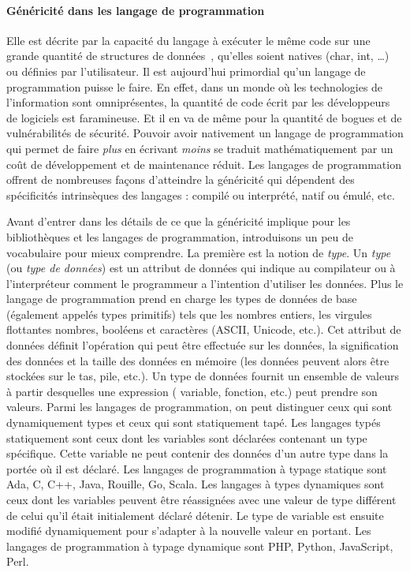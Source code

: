 \paragraph{Généricité dans les langage de programmation} Elle est décrite par la capacité du langage à exécuter le même
code sur une grande quantité de structures de données~\parencite{dehnert.1998.fundamentals}, qu'elles soient natives
(char, int, \ldots) ou définies par l'utilisateur. Il est aujourd'hui primordial qu'un langage de programmation puisse
le faire. En effet, dans un monde où les technologies de l'information sont omniprésentes, la quantité de code écrit par
les développeurs de logiciels est faramineuse. Et il en va de même pour la quantité de bogues et de vulnérabilités de
sécurité. Pouvoir avoir nativement un langage de programmation qui permet de faire \emph{plus} en écrivant \emph{moins}
se traduit mathématiquement par un coût de développement et de maintenance réduit. Les langages de programmation offrent
de nombreuses façons d'atteindre la généricité qui dépendent des spécificités intrinsèques des langages : compilé ou
interprété, natif ou émulé, etc.

Avant d'entrer dans les détails de ce que la généricité implique pour les bibliothèques et les langages de
programmation, introduisons un peu de vocabulaire pour mieux comprendre. La première est la notion de \emph{type}. Un
\emph{type} (ou \emph{type de données}) est un attribut de données qui indique au compilateur ou à l'interpréteur
comment le programmeur a l'intention d'utiliser les données. Plus le langage de programmation prend en charge les types
de données de base (également appelés types primitifs) tels que les nombres entiers, les virgules flottantes nombres,
booléens et caractères (ASCII, Unicode, etc.). Cet attribut de données définit l'opération qui peut être effectuée sur
les données, la signification des données et la taille des données en mémoire (les données peuvent alors être stockées
sur le tas, pile, etc.). Un type de données fournit un ensemble de valeurs à partir desquelles une expression (\ie
variable, fonction, etc.) peut prendre son valeurs. Parmi les langages de programmation, on peut distinguer ceux qui
sont dynamiquement types et ceux qui sont statiquement tapé. Les langages typés statiquement sont ceux dont les
variables sont déclarées contenant un type spécifique. Cette variable ne peut contenir des données d'un autre type dans
la portée où il est déclaré. Les langages de programmation à typage statique sont Ada, C, C++, Java, Rouille, Go, Scala.
Les langages à types dynamiques sont ceux dont les variables peuvent être réassignées avec une valeur de type différent
de celui qu'il était initialement déclaré détenir. Le type de variable est ensuite modifié dynamiquement pour s'adapter
à la nouvelle valeur en portant. Les langages de programmation à typage dynamique sont PHP, Python, JavaScript, Perl.
